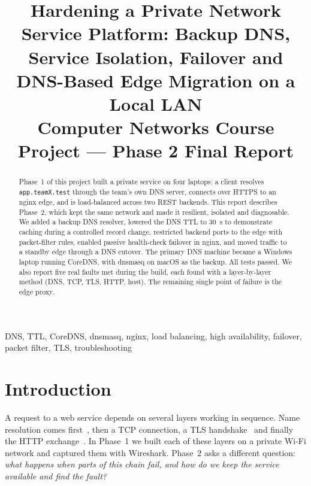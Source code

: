 \documentclass[conference]{IEEEtran}
\begin{document}
\title{Hardening a Private Network Service Platform: Backup DNS, Service Isolation, Failover and DNS-Based Edge Migration on a Local LAN\\[4pt]
\large Computer Networks Course Project --- Phase 2 Final Report}

\author{\IEEEauthorblockN{[Name 1], [Name 2], [Name 3], [Name 4]}
}

\maketitle

\begin{abstract}
Phase~1 of this project built a private service on four laptops: a client resolves \texttt{app.teamX.test} through the team's own DNS server, connects over HTTPS to an nginx edge, and is load-balanced across two REST backends. This report describes Phase~2, which kept the same network and made it resilient, isolated and diagnosable. We added a backup DNS resolver, lowered the DNS TTL to 30~s to demonstrate caching during a controlled record change, restricted backend ports to the edge with packet-filter rules, enabled passive health-check failover in nginx, and moved traffic to a standby edge through a DNS cutover. The primary DNS machine became a Windows laptop running CoreDNS, with dnsmasq on macOS as the backup. All tests passed. We also report five real faults met during the build, each found with a layer-by-layer method (DNS, TCP, TLS, HTTP, host). The remaining single point of failure is the edge proxy.
\end{abstract}

\begin{IEEEkeywords}
DNS, TTL, CoreDNS, dnsmasq, nginx, load balancing, high availability, failover, packet filter, TLS, troubleshooting
\end{IEEEkeywords}

\section{Introduction}
A request to a web service depends on several layers working in sequence. Name resolution comes first~\cite{rfc1034,rfc1035}, then a TCP connection, a TLS handshake~\cite{rfc8446} and finally the HTTP exchange~\cite{rfc9110}. In Phase~1 we built each of these layers on a private Wi-Fi network and captured them with Wireshark. Phase~2 asks a different question: \emph{what happens when parts of this chain fail, and how do we keep the service available and find the fault?}
\end{document}
